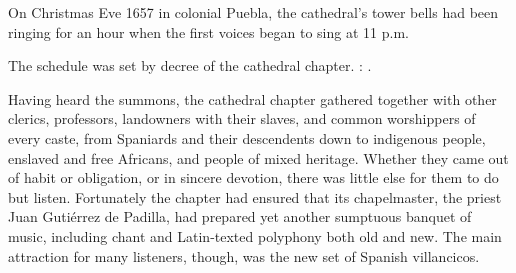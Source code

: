 On Christmas Eve 1657 in colonial Puebla, the cathedral's tower bells had been
ringing for an hour when the first voices began to sing at 11 p.m.%
\begin{Footnote}
    \label{fn:Puebla-Matins-time}
    The schedule was set by decree of the cathedral chapter.
    :
    .
\end{Footnote}
Having heard the summons, the cathedral chapter gathered together with other
clerics, professors, landowners with their slaves, and common worshippers of
every caste, from Spaniards and their descendents down to indigenous people,
enslaved and free Africans, and people of mixed heritage.%
    \Autocites
    {AngelContreras:Puebla}
    {Lomeli:Puebla}
    {Sierra:UrbanSlavery}
Whether they came out of habit or obligation, or in sincere devotion, there was
little else for them to do but listen.
Fortunately the chapter had ensured that its chapelmaster, the priest Juan
Gutiérrez de Padilla, had prepared yet another sumptuous banquet of music,
including chant and Latin-texted polyphony both old and new.%
    \Autocites
    {Gembero:Padilla}
    {Hurtado:Padilla}
    {Stevenson:Padilla}
    {Miranda:PadillaLuz}
    {Gali:RitualesSonorosPuebla}
    {Swadley:VillancicoPhD}
The main attraction for many listeners, though, was the new set of Spanish
villancicos.


